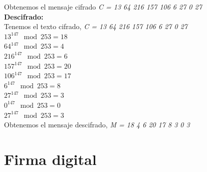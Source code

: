 Obtenemos el mensaje cifrado \textit{ C = 13 64 216 157 106 6 27 0 27} \\

\textbf{Descifrado: } \\

Tenemos el texto cifrado, \textit{ C = 13 64 216 157 106 6 27 0 27} \\

\textit{$ 13^{147} \mod 253 = 18$} \\

\textit{$ 64^{147} \mod 253 = 4$} \\

\textit{$ 216^{147} \mod 253 = 6$} \\

\textit{$ 157^{147} \mod 253 = 20$} \\

\textit{$ 106^{147} \mod 253 = 17$} \\

\textit{$ 6^{147} \mod 253 = 8$} \\

\textit{$ 27^{147} \mod 253 = 3$} \\

\textit{$ 0^{147} \mod 253 = 0$} \\

\textit{$ 27^{147} \mod 253 = 3$} \\

Obtenemos el mensaje descifrado, \textit{ M = 18 4 6 20 17 8 3 0 3} \\



\section{Firma digital}

